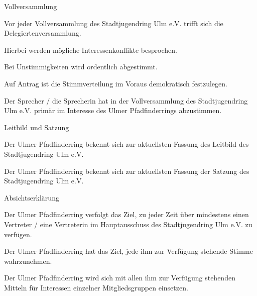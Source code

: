 \begin{legal}
        \begin{legal}
            \item Vollversammlung
                \begin{legal}
                    \item Vor jeder Vollversammlung des Stadtjugendring Ulm e.V. trifft sich die 
                          Delegiertenversammlung.
                    \item Hierbei werden mögliche Interessenkonflikte besprochen.
                        \begin{legal}
                            \item Bei Unstimmigkeiten wird ordentlich abgestimmt.
                        \end{legal}
                    \item Auf Antrag ist die Stimmverteilung im Voraus demokratisch festzulegen.
                    \item Der Sprecher / die Sprecherin hat in der Vollversammlung des 
                          Stadtjugendring Ulm e.V. primär im Interesse des Ulmer Pfadfinderrings 
                          abzustimmen.
                \end{legal}
            \item Leitbild und Satzung
                \begin{legal}
                    \item Der Ulmer Pfadfinderring bekennt sich zur aktuellsten Fassung 
                          des Leitbild des Stadtjugendring Ulm e.V.
                    \item Der Ulmer Pfadfinderring bekennt sich zur aktuellsten Fassung der 
                          Satzung des Stadtjugendring Ulm e.V.
                \end{legal}
        \end{legal}
    \item Absichtserklärung
        \begin{legal}
            \item Der Ulmer Pfadfinderring verfolgt das Ziel, zu jeder Zeit über mindestens einen 
                  Vertreter / eine Vertreterin im Hauptausschuss des Stadtjugendring Ulm e.V. zu 
                  verfügen.
            \item Der Ulmer Pfadfinderring hat das Ziel, jede ihm zur Verfügung stehende Stimme 
                  wahrzunehmen.
            \item Der Ulmer Pfadfinderring wird sich mit allen ihm zur Verfügung stehenden 
                  Mitteln für Interessen einzelner Mitgliedsgruppen einsetzen.
        \end{legal}
\end{legal}
